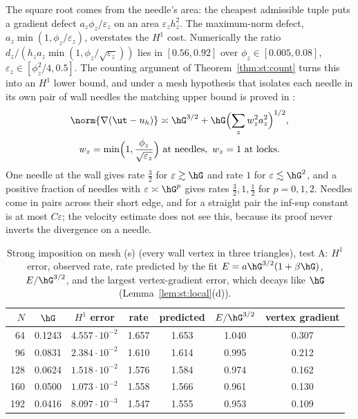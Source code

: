 The square root comes from the needle's area: the cheapest admissible tuple puts a gradient defect $a_z\phi_z/\varepsilon_z$ on an area $\varepsilon_zh_z^2$. The maximum-norm defect, $a_z\min(1,\phi_z/\varepsilon_z)$, overstates the $H^1$ cost. Numerically the ratio $d_z/(h_za_z\min(1,\phi_z/\sqrt{\varepsilon_z}))$ lies in $[0.56,0.92]$ over $\phi_z\in[0.005,0.08]$, $\varepsilon_z\in[\phi_z^2/4,0.5]$. The counting argument of Theorem~\ref{thm:st:count} turns this into an $H^1$ lower bound, and under a mesh hypothesis that isolates each needle in its own pair of wall needles the matching upper bound is proved in \cite{PadhiExt}:
\begin{gather*}
\norm{\nabla(\ut-u_h)}\asymp\hG^{3/2}+\hG\Bigl(\sum_zw_z^2a_z^2\Bigr)^{1/2},\\
w_z=\min\Bigl(1,\frac{\phi_z}{\sqrt{\varepsilon_z}}\Bigr)\ \text{at needles},\ w_z=1\ \text{at locks}.
\end{gather*}
One needle at the wall gives rate $\frac32$ for $\varepsilon\gtrsim\hG$ and rate $1$ for $\varepsilon\lesssim\hG^2$, and a positive fraction of needles with $\varepsilon\asymp\hG^p$ gives rates $\frac32,1,\frac12$ for $p=0,1,2$. Needles come in pairs across their short edge, and for a straight pair the inf-sup constant is at most $C\varepsilon$; the velocity estimate does not see this, because its proof never inverts the divergence on a needle.

\begin{table}[t]
\centering\small
\caption{Strong imposition on mesh (s) (every wall vertex in three triangles), test A: $H^1$ error, observed rate, rate predicted by the fit $E=a\hG^{3/2}(1+\beta\hG)$, $E/\hG^{3/2}$, and the largest vertex-gradient error, which decays like $\hG$ (Lemma~\ref{lem:st:local}(d)).}\label{tab:drift}
\begin{tabular}{rcccccc}
\toprule
$N$ & $\hG$ & $H^1$ error & rate & predicted & $E/\hG^{3/2}$ & vertex gradient\\
\midrule
64 & 0.1243 & $4.557\cdot10^{-2}$ & 1.657 & 1.653 & 1.040 & 0.307\\
96 & 0.0831 & $2.384\cdot10^{-2}$ & 1.610 & 1.614 & 0.995 & 0.212\\
128 & 0.0624 & $1.518\cdot10^{-2}$ & 1.576 & 1.584 & 0.974 & 0.162\\
160 & 0.0500 & $1.073\cdot10^{-2}$ & 1.558 & 1.566 & 0.961 & 0.130\\
192 & 0.0416 & $8.097\cdot10^{-3}$ & 1.547 & 1.555 & 0.953 & 0.109\\
\bottomrule
\end{tabular}
\end{table}

